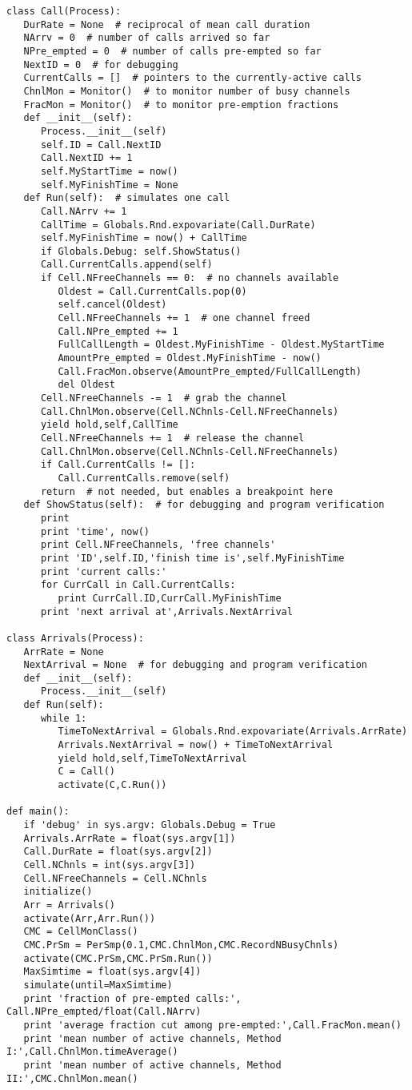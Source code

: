 \documentclass[11pt]{article}
\begin{document}
\begin{Verbatim}[fontsize=\relsize{-2}]
class Call(Process):
   DurRate = None  # reciprocal of mean call duration
   NArrv = 0  # number of calls arrived so far
   NPre_empted = 0  # number of calls pre-empted so far
   NextID = 0  # for debugging
   CurrentCalls = []  # pointers to the currently-active calls
   ChnlMon = Monitor()  # to monitor number of busy channels
   FracMon = Monitor()  # to monitor pre-emption fractions
   def __init__(self):
      Process.__init__(self)
      self.ID = Call.NextID
      Call.NextID += 1
      self.MyStartTime = now()
      self.MyFinishTime = None
   def Run(self):  # simulates one call
      Call.NArrv += 1
      CallTime = Globals.Rnd.expovariate(Call.DurRate)
      self.MyFinishTime = now() + CallTime
      if Globals.Debug: self.ShowStatus()
      Call.CurrentCalls.append(self)
      if Cell.NFreeChannels == 0:  # no channels available
         Oldest = Call.CurrentCalls.pop(0)
         self.cancel(Oldest)
         Cell.NFreeChannels += 1  # one channel freed
         Call.NPre_empted += 1
         FullCallLength = Oldest.MyFinishTime - Oldest.MyStartTime
         AmountPre_empted = Oldest.MyFinishTime - now()
         Call.FracMon.observe(AmountPre_empted/FullCallLength)
         del Oldest
      Cell.NFreeChannels -= 1  # grab the channel
      Call.ChnlMon.observe(Cell.NChnls-Cell.NFreeChannels)
      yield hold,self,CallTime
      Cell.NFreeChannels += 1  # release the channel
      Call.ChnlMon.observe(Cell.NChnls-Cell.NFreeChannels)
      if Call.CurrentCalls != []:
         Call.CurrentCalls.remove(self)
      return  # not needed, but enables a breakpoint here
   def ShowStatus(self):  # for debugging and program verification
      print
      print 'time', now()
      print Cell.NFreeChannels, 'free channels'
      print 'ID',self.ID,'finish time is',self.MyFinishTime
      print 'current calls:'
      for CurrCall in Call.CurrentCalls:
         print CurrCall.ID,CurrCall.MyFinishTime
      print 'next arrival at',Arrivals.NextArrival

class Arrivals(Process):
   ArrRate = None
   NextArrival = None  # for debugging and program verification
   def __init__(self):
      Process.__init__(self)
   def Run(self):
      while 1:
         TimeToNextArrival = Globals.Rnd.expovariate(Arrivals.ArrRate)
         Arrivals.NextArrival = now() + TimeToNextArrival
         yield hold,self,TimeToNextArrival
         C = Call()
         activate(C,C.Run())

def main():
   if 'debug' in sys.argv: Globals.Debug = True
   Arrivals.ArrRate = float(sys.argv[1])
   Call.DurRate = float(sys.argv[2])
   Cell.NChnls = int(sys.argv[3])
   Cell.NFreeChannels = Cell.NChnls
   initialize()  
   Arr = Arrivals()
   activate(Arr,Arr.Run())
   CMC = CellMonClass()
   CMC.PrSm = PerSmp(0.1,CMC.ChnlMon,CMC.RecordNBusyChnls)
   activate(CMC.PrSm,CMC.PrSm.Run())
   MaxSimtime = float(sys.argv[4])
   simulate(until=MaxSimtime)
   print 'fraction of pre-empted calls:', Call.NPre_empted/float(Call.NArrv)
   print 'average fraction cut among pre-empted:',Call.FracMon.mean()
   print 'mean number of active channels, Method I:',Call.ChnlMon.timeAverage()
   print 'mean number of active channels, Method II:',CMC.ChnlMon.mean()


\end{Verbatim}
\end{document}
